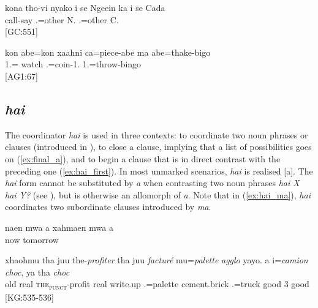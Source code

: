 \ea\label{ex:kona}\gll kona tho-vi nyako i se Ngeein ka i se Cada\\
  call-say  .=other N.  .=other C.\\
\glt {} {[GC:551]}
\z


\ea\label{ex:kon}
\gll kon abe=kon xaahni ca=piece-abe ma abe=thake-bigo\\
  1.= watch .=coin-1.  1.=throw-bingo\\
\glt {} {[AG1:67]}
\z

\subsection{\textit{hai} }
The coordinator \textit{hai} is used in three contexts: to coordinate two noun phrases or clauses (introduced in ), to close a clause, implying that a list of possibilities goes on (\ref{ex:final_a}), and to begin a clause that is in direct contrast with the preceding one (\ref{ex:hai_first}). In most unmarked scenarios, \textit{hai} is realised {[a]}. The \textit{hai} form cannot be substituted by \textit{a} when contrasting two noun phrases \textit{hai X hai Y?}  (see ), but is otherwise an allomorph of \textit{a}. Note that in (\ref{ex:hai_ma}), \textit{hai} coordinates two subordinate clauses introduced by \textit{ma}.


\ea\label{ex:final_a}
\gll naen mwa a xahmaen mwa a\\
 now   tomorrow  \\
\glt {}
\z

\ea\label{ex:hai_first}\gll xhaohmu tha juu the-\textit{profiter} tha juu \textit{facturé} mu=\textit{palette} \textit{agglo} yayo. a i=\textit{camion} \textit{choc}, ya tha \textit{choc}\\
 old  real \textsc{the\textsubscript{punct}}-profit  real write.up .=palette cement.brick   .=truck good 3  good\\
\glt {} {[KG:535-536]}
\z


